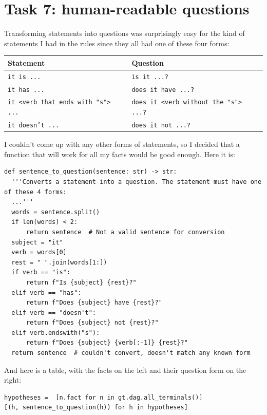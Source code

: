 \documentclass[11pt]{article}
\begin{document}
\section{Task 7: human-readable questions}
\label{sec:orgaf9919b}

Transforming statements into questions was surprisingly easy for the kind of statements I had in the rules
since they all had one of these four forms:

\begin{center}
\begin{tabular}{ll}
Statement & Question\\[0pt]
\hline
\texttt{it is ...} & \texttt{is it ...?}\\[0pt]
\texttt{it has ...} & \texttt{does it have ...?}\\[0pt]
\texttt{it <verb that ends with "s"> ...} & \texttt{does it <verb without the "s"> ...?}\\[0pt]
\texttt{it doesn't ...} & \texttt{does it not ...?}\\[0pt]
\end{tabular}
\end{center}


I couldn't come up with any other forms of statements,
so I decided that a function that will work for all my facts would be good enough.
Here it is:
\begin{verbatim}
def sentence_to_question(sentence: str) -> str:
  '''Converts a statement into a question. The statement must have one of these 4 forms:
  ...'''
  words = sentence.split()
  if len(words) < 2:
      return sentence  # Not a valid sentence for conversion
  subject = "it"
  verb = words[0]
  rest = " ".join(words[1:])
  if verb == "is":
      return f"Is {subject} {rest}?"
  elif verb == "has":
      return f"Does {subject} have {rest}?"
  elif verb == "doesn't":
      return f"Does {subject} not {rest}?"
  elif verb.endswith("s"):
      return f"Does {subject} {verb[:-1]} {rest}?"
  return sentence  # couldn't convert, doesn't match any known form
\end{verbatim}

And here is a table, with the facts on the left and their question form on the right:
\begin{verbatim}
hypotheses =  [n.fact for n in gt.dag.all_terminals()]
[(h, sentence_to_question(h)) for h in hypotheses]
\end{verbatim}
\end{document}
